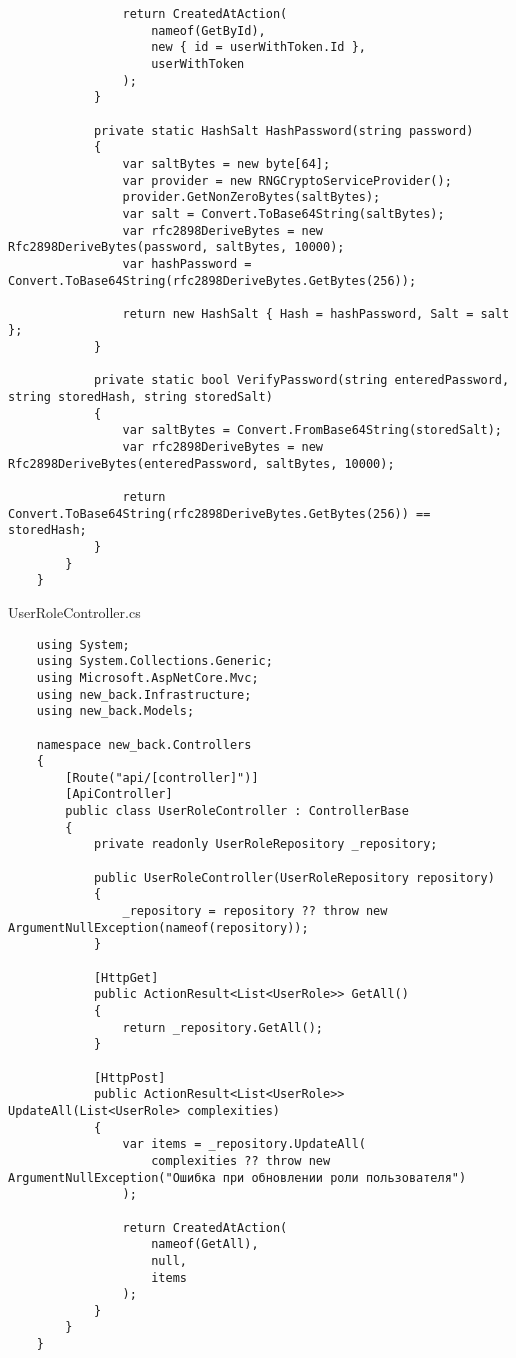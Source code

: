 \begin{lstlisting}
                return CreatedAtAction(
                    nameof(GetById),
                    new { id = userWithToken.Id },
                    userWithToken
                );
            }
            
            private static HashSalt HashPassword(string password)
            {
                var saltBytes = new byte[64];
                var provider = new RNGCryptoServiceProvider();
                provider.GetNonZeroBytes(saltBytes);
                var salt = Convert.ToBase64String(saltBytes);
                var rfc2898DeriveBytes = new Rfc2898DeriveBytes(password, saltBytes, 10000);
                var hashPassword = Convert.ToBase64String(rfc2898DeriveBytes.GetBytes(256));
    
                return new HashSalt { Hash = hashPassword, Salt = salt };
            }
            
            private static bool VerifyPassword(string enteredPassword, string storedHash, string storedSalt)
            {
                var saltBytes = Convert.FromBase64String(storedSalt);
                var rfc2898DeriveBytes = new Rfc2898DeriveBytes(enteredPassword, saltBytes, 10000);
                
                return Convert.ToBase64String(rfc2898DeriveBytes.GetBytes(256)) == storedHash;
            }
        }
    }    
\end{lstlisting}

UserRoleController.cs
\lstset{style=sharpc}
\begin{lstlisting}
    using System;
    using System.Collections.Generic;
    using Microsoft.AspNetCore.Mvc;
    using new_back.Infrastructure;
    using new_back.Models;
    
    namespace new_back.Controllers
    {
        [Route("api/[controller]")]
        [ApiController]
        public class UserRoleController : ControllerBase
        {
            private readonly UserRoleRepository _repository;
            
            public UserRoleController(UserRoleRepository repository)
            {
                _repository = repository ?? throw new ArgumentNullException(nameof(repository));
            }
            
            [HttpGet]
            public ActionResult<List<UserRole>> GetAll()
            {
                return _repository.GetAll();
            }
            
            [HttpPost]
            public ActionResult<List<UserRole>> UpdateAll(List<UserRole> complexities)
            {
                var items = _repository.UpdateAll(
                    complexities ?? throw new ArgumentNullException("Ошибка при обновлении роли пользователя")
                );
    
                return CreatedAtAction(
                    nameof(GetAll),
                    null,
                    items
                );
            }
        }
    }
\end{lstlisting}

